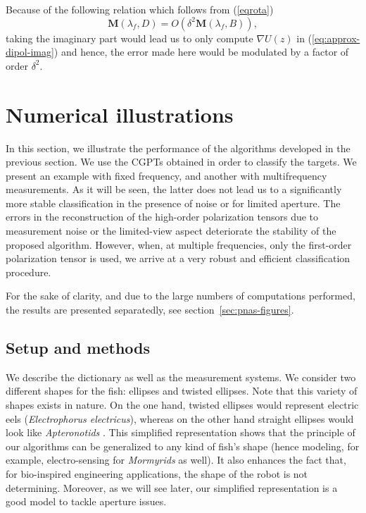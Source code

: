 Because of the following relation which follows from
(\ref{eqrota})
\begin{equation*}
\mathbf{M}(\lambda_f,D) = O(\delta^2 \mathbf{M}(\lambda_f,B)),
\end{equation*}
taking the imaginary part would lead us to only compute  $\nabla
U(z)$ in (\ref{eq:approx-dipol-imag}) and hence, the error made
here would be modulated by a factor of order $\delta^2$.





\section{Numerical illustrations}

\label{sec:numeric-pnas}

In this section, we illustrate the performance of the algorithms
developed in the previous section. We use the CGPTs obtained in
order to classify the targets. We present an example with fixed
frequency, and another with multifrequency measurements. As it
will be seen, the latter does not lead us to a significantly more
stable classification in the presence of noise or for limited
aperture. The errors in the reconstruction of the high-order
polarization tensors due to measurement noise or the limited-view
aspect deteriorate the stability of the proposed algorithm.
However, when, at multiple frequencies, only the first-order
polarization tensor is used, we arrive at a very robust and
efficient classification procedure.

For the sake of clarity, and due to the large numbers of computations
performed, the results are presented separatedly, see section~\ref{sec:pnas-figures}.


\subsection{Setup and methods}
We describe the dictionary as well as the measurement systems. We
consider two different shapes for the fish: ellipses and twisted
ellipses. Note that this variety of shapes exists in nature. On
the one hand, twisted ellipses would represent electric eels
(\emph{Electrophorus electricus}), whereas on the other hand
straight ellipses would look like \emph{Apteronotids}
\cite{moller1995electric}. This simplified representation shows that the
principle of our algorithms can be generalized to any kind of
fish's shape (hence modeling, for example, electro-sensing for
\emph{Mormyrids} as well). It also enhances the fact that, for
bio-inspired engineering applications, the shape of the robot is
not determining. Moreover, as we will see later, our simplified
representation is a good model to tackle aperture issues.


